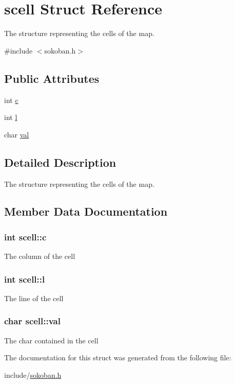 \hypertarget{structscell}{\section{scell Struct Reference}
\label{structscell}
}


The structure representing the cells of the map.  




{\ttfamily \#include $<$sokoban.\-h$>$}

\subsection*{Public Attributes}
\begin{DoxyCompactItemize}
\item 
int \hyperlink{structscell_a11b8c66a9f1ec6378d4a875f967ebb19}{c}
\item 
int \hyperlink{structscell_af9df36a35c878b1181241155ebb03557}{l}
\item 
char \hyperlink{structscell_a98a7224c2443ef0d49a20fb046dcd32a}{val}
\end{DoxyCompactItemize}


\subsection{Detailed Description}
The structure representing the cells of the map. 

\subsection{Member Data Documentation}
\hypertarget{structscell_a11b8c66a9f1ec6378d4a875f967ebb19}{
\subsubsection[{c}]{\setlength{\rightskip}{0pt plus 5cm}int scell\-::c}}\label{structscell_a11b8c66a9f1ec6378d4a875f967ebb19}
The column of the cell \hypertarget{structscell_af9df36a35c878b1181241155ebb03557}{
\subsubsection[{l}]{\setlength{\rightskip}{0pt plus 5cm}int scell\-::l}}\label{structscell_af9df36a35c878b1181241155ebb03557}
The line of the cell \hypertarget{structscell_a98a7224c2443ef0d49a20fb046dcd32a}{
\subsubsection[{val}]{\setlength{\rightskip}{0pt plus 5cm}char scell\-::val}}\label{structscell_a98a7224c2443ef0d49a20fb046dcd32a}
The char contained in the cell 

The documentation for this struct was generated from the following file\-:\begin{DoxyCompactItemize}
\item 
include/\hyperlink{sokoban_8h}{sokoban.\-h}\end{DoxyCompactItemize}
